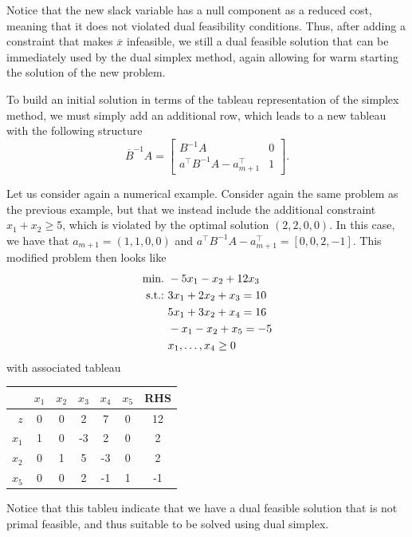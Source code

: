 Notice that the new slack variable has a null component as a reduced cost, meaning that it does not violated dual feasibility conditions. Thus, after adding a constraint that makes $\overline{x}$ infeasible, we still a dual feasible solution that can be immediately used by the dual simplex method, again allowing for warm starting the solution of the new problem.

To build an initial solution in terms of the tableau representation of the simplex method, we must simply add an additional row, which leads to a new tableau with the following structure
%
\begin{equation*}
	\overline{B}^{-1}A = \begin{bmatrix} B^{-1}A & 0 \\ a^\top B^{-1}A - a_{m+1}^\top & 1 \end{bmatrix}.
\end{equation*}
%		

Let us consider again a numerical example. Consider again the same problem as the previous example, but that we instead include the additional constraint $x_1 + x_2 \geq 5$, which is violated by the optimal solution $(2,2,0,0)$. In this case, we have that $a_{m+1} = (1,1,0,0)$ and $a^\top B^{-1} A - a^\top_{m+1} = [0, 0, 2, -1]$. This modified problem then looks like
%
\begin{align*}
	\mathop{\text{min.~}} & -5x_1 -x_2 + 12 x_3 \\
	\mathop{\text{s.t.:~}}   & 3x_1 + 2x_2 + x_3  = 10 \\
	& 5x_1 + 3x_2 + x_4 = 16 \\
	& -x_1 - x_2 + x_5 = -5  \\
	& x_1, \dots, x_4 \geq 0
\end{align*}
%
with associated tableau

\begin{center}
	\begin{tabular}{r|ccccc|c} 
	   &$x_1$ & $x_2$ & $x_3$ & $x_4$ & $x_5$ & RHS \\ \hline	
	   $z$ & 0 & 0 & 2 & 7 & 0 & 12                 \\ \hline
	   $x_1$ & 1 & 0 & -3 & 2 & 0 & 2 				\\
	   $x_2$ & 0 & 1 & 5 & -3 & 0 & 2 				\\
	   $x_5$ &  0 &  0 &  2 & -1 & 1 & -1           
	\end{tabular}
\end{center}

Notice that this tableu indicate that we have a dual feasible solution that is not primal feasible, and thus suitable to be solved using dual simplex.
	
